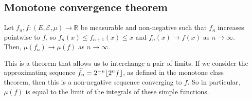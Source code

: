 \subsection{Monotone convergence theorem}
\begin{theorem}
	Let \( f_n, f \colon (E,\mathcal E,\mu) \to \mathbb R \) be measurable and non-negative such that \( f_n \) increases pointwise to \( f \), so \( f_n(x) \leq f_{n+1}(x) \leq x \) and \( f_n(x) \to f(x) \) as \( n \to \infty \).
	Then, \( \mu(f_n) \to \mu(f) \) as \( n \to \infty \).
\end{theorem}
\begin{remark}
	This is a theorem that allows us to interchange a pair of limits.
	If we consider the approximating sequence \( \widetilde f_n = 2^{-n} \lfloor2^n f\rfloor \), as defined in the monotone class theorem, then this is a non-negative sequence converging to \( f \).
	So in particular, \( \mu(f) \) is equal to the limit of the integrals of these simple functions.
\end{remark}
